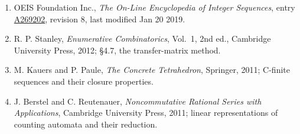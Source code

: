 \documentclass[11pt]{article}
\theoremstyle{definition}
\begin{document}
\begin{enumerate}

\item OEIS Foundation Inc., \emph{The On-Line Encyclopedia of Integer Sequences}, entry \href{https://oeis.org/A269202}{A269202}, revision 8, last modified Jan 20 2019.

\item R. P. Stanley, \emph{Enumerative Combinatorics}, Vol.~1, 2nd ed., Cambridge University Press, 2012; \S4.7, the transfer-matrix method.

\item M. Kauers and P. Paule, \emph{The Concrete Tetrahedron}, Springer, 2011; C-finite sequences and their closure properties.

\item J. Berstel and C. Reutenauer, \emph{Noncommutative Rational Series with Applications}, Cambridge University Press, 2011; linear representations of counting automata and their reduction.

\end{enumerate}
\end{document}
